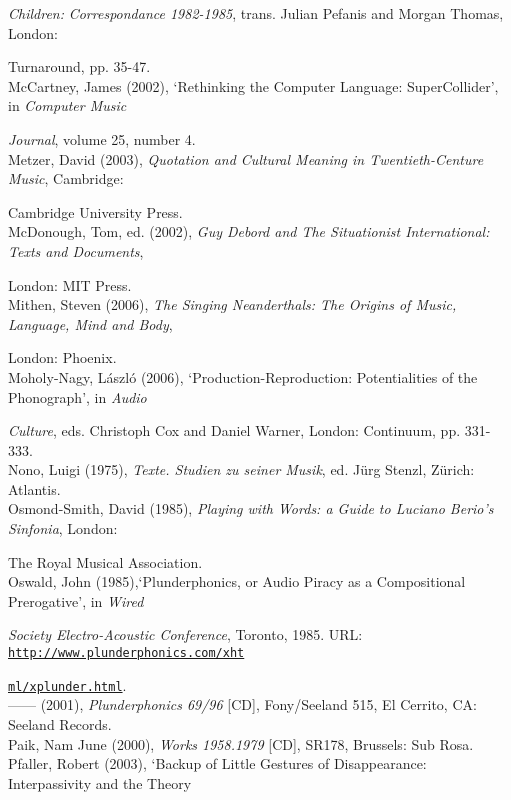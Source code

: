 \emph{Children:} \emph{Correspondance 1982-1985}, trans. Julian Pefanis and Morgan Thomas, London: 

Turnaround, pp. 35-47. 
\hypertarget{mccartney}{}\\
McCartney, James (2002), `Rethinking the Computer Language: SuperCollider', in \emph{Computer Music} 

\emph{Journal}, volume 25, number 4.
\hypertarget{metzer}{}\\
Metzer, David (2003), \emph{Quotation and Cultural Meaning in Twentieth-Centure Music}, Cambridge: 

Cambridge University Press.
\hypertarget{mcdonough}{}\\
McDonough, Tom, ed. (2002), \emph{Guy Debord and The Situationist International: Texts and Documents}, 

London: MIT Press. 
\hypertarget{mithen}{}\\
Mithen, Steven (2006), \emph{The Singing Neanderthals: The Origins of Music, Language, Mind and Body}, 

London: Phoenix. 
\hypertarget{moholy}{}\\
Moholy-Nagy, L\'{a}szl\'{o} (2006),  `Production-Reproduction: Potentialities of the Phonograph', in \emph{Audio} 

\emph{Culture}, eds. Christoph Cox and Daniel Warner, London: Continuum, pp. 331-333.
\hypertarget{nono}{}\\
Nono, Luigi (1975), \emph{Texte. Studien zu seiner Musik}, ed. J\"{u}rg Stenzl, Z\"{u}rich: Atlantis. 
\hypertarget{ossmith}{}\\
Osmond-Smith, David (1985), \emph{Playing with Words: a Guide to Luciano Berio's Sinfonia},  London: 

The Royal Musical Association. 
\hypertarget{oswald}{}\\
Oswald, John (1985),`Plunderphonics, or Audio Piracy as a Compositional Prerogative', in \emph{Wired}

\emph{Society Electro-Acoustic Conference}, Toronto, 1985. URL: \href{http://www.plunderphonics.com/xhtml/xplunder.html}{\texttt{http://www.plunderphonics.com/xht}}

\href{http://www.plunderphonics.com/xhtml/xplunder.html}{\texttt{ml/xplunder.html}}.
\hypertarget{oswaldcd}{}\\
------ (2001), \emph{Plunderphonics 69/96} [CD], Fony/Seeland 515, El Cerrito, CA: Seeland Records.  
\hypertarget{paik}{}\\
Paik, Nam June (2000), \emph{Works 1958.1979} [CD], SR178, Brussels: Sub Rosa. 
\hypertarget{pfaller}{}\\
Pfaller, Robert (2003), `Backup of Little Gestures of Disappearance: Interpassivity and the Theory 

